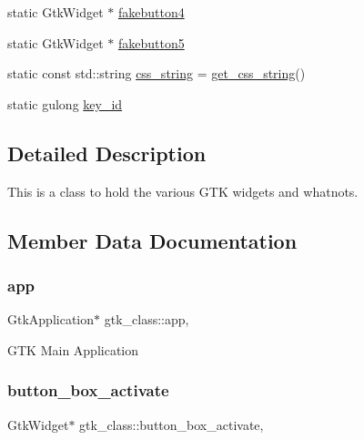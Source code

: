\begin{DoxyCompactItemize}
\item 
static Gtk\+Widget $\ast$ \hyperlink{classgtk__class_aad855c1e236264394ed7a353fc06fac5}{fakebutton4}
\item 
static Gtk\+Widget $\ast$ \hyperlink{classgtk__class_a39e7f05de43cf5c68285267198631336}{fakebutton5}
\item 
static const std\+::string \hyperlink{classgtk__class_a5cb715b2c56782b35912923c022cb08e}{css\+\_\+string} = \hyperlink{gtk__LunAero_8hpp_adb72df5ed4fc630244a078d8d8634b1d}{get\+\_\+css\+\_\+string}()
\item 
static gulong \hyperlink{classgtk__class_a7599d9e82fd4e3a6215730f96719d7cc}{key\+\_\+id}
\end{DoxyCompactItemize}


\subsection{Detailed Description}
This is a class to hold the various G\+TK widgets and whatnots. 

\subsection{Member Data Documentation}
\mbox{\label{classgtk__class_ae45e5712c6b5c5f0fa42a60aaff9f936}} 
\subsubsection{\texorpdfstring{app}{app}}
{\footnotesize\ttfamily Gtk\+Application$\ast$ gtk\+\_\+class\+::app\hspace{0.3cm}{\ttfamily [inline]}, {\ttfamily [static]}}

G\+TK Main Application \mbox{\label{classgtk__class_a0234a576c91f5d8999260eac4b6968b7}} 
\subsubsection{\texorpdfstring{button\+\_\+box\+\_\+activate}{button\_box\_activate}}
{\footnotesize\ttfamily Gtk\+Widget$\ast$ gtk\+\_\+class\+::button\+\_\+box\+\_\+activate\hspace{0.3cm}{\ttfamily [inline]}, {\ttfamily [static]}}

